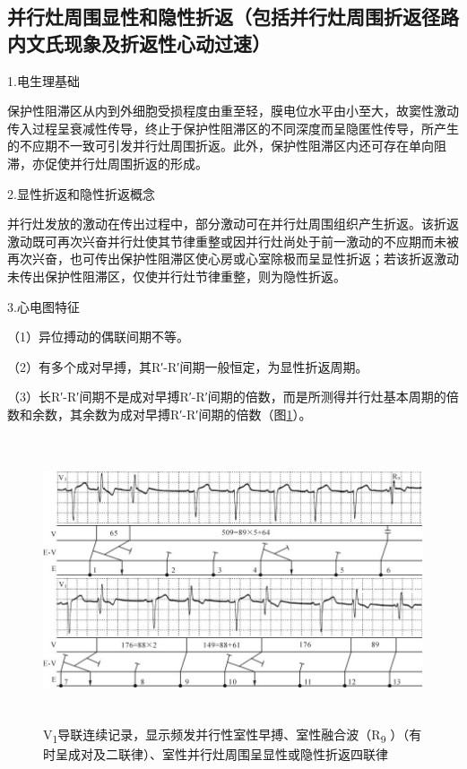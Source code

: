 \protect\hypertarget{text00023.htmlux5cux23subid291}{}{}

\subsection{并行灶周围显性和隐性折返（包括并行灶周围折返径路内文氏现象及折返性心动过速）}

1.电生理基础

保护性阻滞区从内到外细胞受损程度由重至轻，膜电位水平由小至大，故窦性激动传入过程呈衰减性传导，终止于保护性阻滞区的不同深度而呈隐匿性传导，所产生的不应期不一致可引发并行灶周围折返。此外，保护性阻滞区内还可存在单向阻滞，亦促使并行灶周围折返的形成。

2.显性折返和隐性折返概念

并行灶发放的激动在传出过程中，部分激动可在并行灶周围组织产生折返。该折返激动既可再次兴奋并行灶使其节律重整或因并行灶尚处于前一激动的不应期而未被再次兴奋，也可传出保护性阻滞区使心房或心室除极而呈显性折返；若该折返激动未传出保护性阻滞区，仅使并行灶节律重整，则为隐性折返。

3.心电图特征

（1）异位搏动的偶联间期不等。

（2）有多个成对早搏，其R′-R′间期一般恒定，为显性折返周期。

（3）长R′-R′间期不是成对早搏R′-R′间期的倍数，而是所测得并行灶基本周期的倍数和余数，其余数为成对早搏R′-R′间期的倍数（图\ref{fig16-15}）。

\begin{figure}[!htbp]
 \centering
 \includegraphics[width=5.8125in,height=3.32292in]{./images/Image00291.jpg}
 \captionsetup{justification=centering}
 \caption{V\textsubscript{1}导联连续记录，显示频发并行性室性早搏、室性融合波（R\textsubscript{9} ）（有时呈成对及二联律）、室性并行灶周围呈显性或隐性折返四联律}
 \label{fig16-15}
  \end{figure} 


